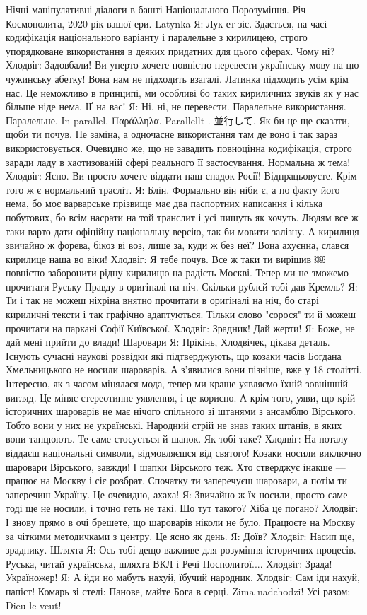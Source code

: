 \obeycr
Нічні маніпулятивні діалоги в башті Національного Порозуміння. 
Річ Космополита, 2020 рік вашої ери.
Latynka
Я: Лук ет зіс. Здається, на часі кодифікація національного варіанту і паралельне з кирилицею, строго упорядковане використання в деяких придатних для цього сферах. Чому ні?
Хлодвіг: Задовбали! Ви уперто хочете повністю перевести українську мову на цю чужинську абетку! Вона нам не підходить взагалі. Латинка підходить усім крім нас. Це неможливо в принципі, ми особливі бо таких кириличних звуків як у нас більше ніде нема. ЇҐ на вас!
Я: Ні, ні, не перевести. Паралельне використання. Паралельне. 
In parallel. Παράλληλα. Parallellt . 並行して. Як би це ще сказати, щоби ти почув. Не заміна, а одночасне використання там де воно і так зараз використовується. Очевидно же, що не завадить повноцінна кодифікація, строго заради ладу в хаотизованій сфері реального її застосування. Нормальна ж тема!
Хлодвіг: Ясно. Ви просто хочете віддати наш спадок Росії! Відпрацьовуєте. Крім того ж є нормальний трасліт.
Я: Блін. Формально він ніби є, а по факту його нема, бо моє варварське прізвище має два паспортних написання і кілька побутових, бо всім насрати на той транслит і усі пишуть як хочуть. Людям все ж таки варто дати офіційну національну версію, так би мовити залізну. А кирилиця звичайно ж форева, бікоз ві воз, лише за, куди ж без неї? Вона ахуєнна, слався кирилице наша во віки!
Хлодвіг: Я тебе почув. Все ж таки ти вирішив ￼повністю заборонити рідну кирилицю на радість Москві. Тепер ми не зможемо прочитати Руську Правду в оригіналі на ніч. Скільки рублєй тобі дав Кремль?
Я: Ти і так не можеш ніхріна внятно прочитати в оригіналі на ніч, бо старі кириличні тексти і так графічно адаптуються. Тільки слово "сорося" ти й можеш прочитати на паркані Софії Київської.
Хлодвіг: Зрадник! Дай жерти!
Я: Боже, не дай мені прийти до влади!
Шаровари
Я: Прікінь, Хлодвічек, цікава деталь. Існують сучасні наукові розвідки які підтверджують, що козаки часів Богдана Хмельницького не носили шароварів. А з'явилися вони пізніше, вже у 18 столітті. Інтересно, як з часом мінялася мода, тепер ми краще уявляємо їхній зовнішній вигляд. Це міняє стереотипне уявлення, і це корисно. А крім того, уяви, що крій історичних шароварів не має нічого спільного зі штанями з ансамблю Вірського. Тобто вони у них не українські. Народний стрій не знав таких штанів, в яких вони танцюють. Те саме стосується й шапок. Як тобі таке?
Хлодвіг: На поталу віддаєш національні символи, відмовляєшся від святого! Козаки носили виключно шаровари Вірського, завжди! І шапки Вірського теж. Хто стверджує інакше --- працює на Москву і сіє розбрат. Спочатку ти заперечуєш шаровари, а потім ти заперечиш Україну. Це очевидно, ахаха!
Я: Звичайно ж їх носили, просто саме тоді ще не носили, і точно геть не такі. Шо тут такого? Хіба це погано?
Хлодвіг: І знову прямо в очі брешете, що шароварів ніколи не було. Працюєте на Москву за чіткими методичками з центру. Це ясно як день.
Я: Доїв?
Хлодвіг: Насип ще, зраднику.
Шляхта
Я: Ось тобі дещо важливе для розуміння історичних процесів. Руська, читай українська, шляхта ВКЛ і Речі Посполитої....
Хлодвіг: Зрада! Україножер!
Я: А йди но мабуть нахуй, їбучий народник.
Хлодвіг: Сам іди нахуй, папіст! 
Комарь зі стелі: Панове, майте Бога в серці. Zima nadchodzi!
Усі разом: Dieu le veut!
\restorecr
